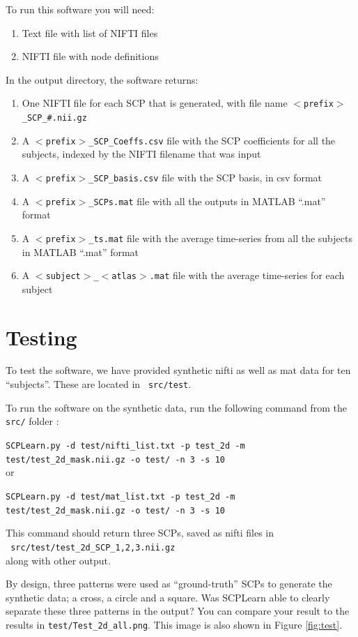 \documentclass[12pt]{article}
\begin{document}
To run this software you will need:
\begin{enumerate}
\item Text file with list of NIFTI files
\item NIFTI file with node definitions
\end{enumerate}
In the output directory, the software returns:
\begin{enumerate}
\item One NIFTI file for each SCP that is generated, with file name \texttt{$<$prefix$>$\_SCP\_\#.nii.gz}
\item A \texttt{$<$prefix$>$\_SCP\_Coeffs.csv} file with the SCP coefficients for all the subjects, indexed by the NIFTI filename that was input
\item A \texttt{$<$prefix$>$\_SCP\_basis.csv} file with the SCP basis, in csv format
\item A \texttt{$<$prefix$>$\_SCPs.mat} file with all the outputs in MATLAB ``.mat'' format
\item A \texttt{$<$prefix$>$\_ts.mat} file with the average time-series from all the subjects in MATLAB ``.mat'' format
\item A \texttt{$<$subject$>$\_$<$atlas$>$.mat} file with the average time-series for each subject 
\end{enumerate}


\section{Testing}
To test the software, we have provided synthetic nifti as well as mat data for ten ``subjects''. These are located in \texttt{ src/test}. 

To run the software on the synthetic data, run the following command from the \texttt{ src/} folder :

\texttt{SCPLearn.py -d test/nifti\_list.txt -p test\_2d -m test/test\_2d\_mask.nii.gz -o test/ -n 3 -s 10}  \\

or 

\texttt{SCPLearn.py -d test/mat\_list.txt -p test\_2d -m test/test\_2d\_mask.nii.gz -o test/ -n 3 -s 10}

This command should return three SCPs, saved as nifti files in  \\
\texttt{  src/test/test\_2d\_SCP\_{1,2,3}.nii.gz } \\
along with other output. 

By design, three patterns were used as ``ground-truth'' SCPs to generate the synthetic data; a cross, a circle and a square.
Was SCPLearn able to clearly separate these three patterns in the output? You can compare your result to the results in \texttt{test/Test\_2d\_all.png}. This image is also shown in Figure \ref{fig:test}.
\end{document}
